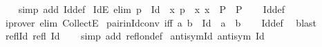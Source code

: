 \begin{isabellebody}
%
\isadelimproof
\ \ %
\endisadelimproof
%
\isatagproof
{}\isamarkupfalse%
\ {\isacharparenleft}{\kern0pt}simp\ add{\isacharcolon}{\kern0pt}\ Id{\isacharunderscore}{\kern0pt}def{\isacharparenright}{\kern0pt}%
\endisatagproof
{\isafoldproof}%
%
\isadelimproof
\isanewline
%
\endisadelimproof
\isanewline
{}\isamarkupfalse%
\ IdE\ {\isacharbrackleft}{\kern0pt}elim{\isacharbang}{\kern0pt}{\isacharbrackright}{\kern0pt}{\isacharcolon}{\kern0pt}\ {\isachardoublequoteopen}p\ {\isasymin}\ Id\ {\isasymLongrightarrow}\ {\isacharparenleft}{\kern0pt}{\isasymAnd}x{\isachardot}{\kern0pt}\ p\ {\isacharequal}{\kern0pt}\ {\isacharparenleft}{\kern0pt}x{\isacharcomma}{\kern0pt}\ x{\isacharparenright}{\kern0pt}\ {\isasymLongrightarrow}\ P{\isacharparenright}{\kern0pt}\ {\isasymLongrightarrow}\ P{\isachardoublequoteclose}\isanewline
%
\isadelimproof
\ \ %
\endisadelimproof
%
\isatagproof
{}\isamarkupfalse%
\ Id{\isacharunderscore}{\kern0pt}def\ \isamarkupfalse%
\ {\isacharparenleft}{\kern0pt}iprover\ elim{\isacharcolon}{\kern0pt}\ CollectE{\isacharparenright}{\kern0pt}%
\endisatagproof
{\isafoldproof}%
%
\isadelimproof
\isanewline
%
\endisadelimproof
\isanewline
{}\isamarkupfalse%
\ pair{\isacharunderscore}{\kern0pt}in{\isacharunderscore}{\kern0pt}Id{\isacharunderscore}{\kern0pt}conv\ {\isacharbrackleft}{\kern0pt}iff{\isacharbrackright}{\kern0pt}{\isacharcolon}{\kern0pt}\ {\isachardoublequoteopen}{\isacharparenleft}{\kern0pt}a{\isacharcomma}{\kern0pt}\ b{\isacharparenright}{\kern0pt}\ {\isasymin}\ Id\ {\isasymlongleftrightarrow}\ a\ {\isacharequal}{\kern0pt}\ b{\isachardoublequoteclose}\isanewline
%
\isadelimproof
\ \ %
\endisadelimproof
%
\isatagproof
{}\isamarkupfalse%
\ Id{\isacharunderscore}{\kern0pt}def\ \isamarkupfalse%
\ blast%
\endisatagproof
{\isafoldproof}%
%
\isadelimproof
\isanewline
%
\endisadelimproof
\isanewline
{}\isamarkupfalse%
\ refl{\isacharunderscore}{\kern0pt}Id{\isacharcolon}{\kern0pt}\ {\isachardoublequoteopen}refl\ Id{\isachardoublequoteclose}\isanewline
%
\isadelimproof
\ \ %
\endisadelimproof
%
\isatagproof
{}\isamarkupfalse%
\ {\isacharparenleft}{\kern0pt}simp\ add{\isacharcolon}{\kern0pt}\ refl{\isacharunderscore}{\kern0pt}on{\isacharunderscore}{\kern0pt}def{\isacharparenright}{\kern0pt}%
\endisatagproof
{\isafoldproof}%
%
\isadelimproof
\isanewline
%
\endisadelimproof
\isanewline
{}\isamarkupfalse%
\ antisym{\isacharunderscore}{\kern0pt}Id{\isacharcolon}{\kern0pt}\ {\isachardoublequoteopen}antisym\ Id{\isachardoublequoteclose}\isanewline

\end{isabellebody}
